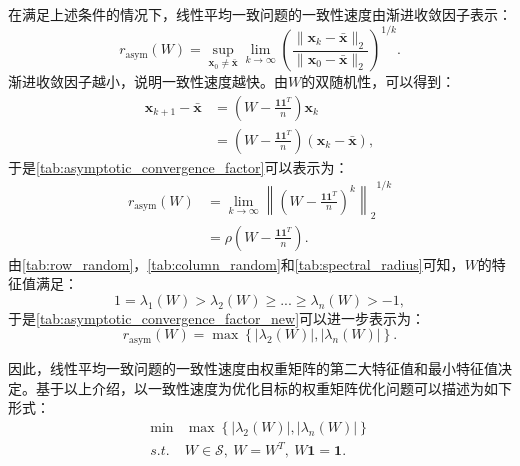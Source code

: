 在满足上述条件的情况下，线性平均一致问题的一致性速度由渐进收敛因子表示：
\begin{equation}
    \label{tab:asymptotic_convergence_factor}
    r_{\mathrm{asym}}(W)=\mathop {\mathrm{sup}} \limits_{\boldsymbol{x}_0\ne \bar{\boldsymbol{x}}}\lim_{k\rightarrow \infty} \left( \frac{\parallel \boldsymbol{x}_k-\bar{\boldsymbol{x}}\parallel _2}{\parallel \boldsymbol{x}_0-\bar{\boldsymbol{x}}\parallel _2} \right) ^{1/k}.
\end{equation}
渐进收敛因子越小，说明一致性速度越快。由$W$的双随机性，可以得到：
\begin{equation}
\begin{aligned}
    \boldsymbol{x}_{k+1}-\bar{\boldsymbol{x}}&=\left( W-\frac{\mathbf{1}\mathbf{1}^T}{n} \right) \boldsymbol{x}_k 
\\
&=\left( W-\frac{\mathbf{1}\mathbf{1}^T}{n} \right) \left( \boldsymbol{x}_k -\bar{\boldsymbol{x}} \right) ,
\end{aligned}
\end{equation}
于是\autoref{tab:asymptotic_convergence_factor}可以表示为：
\begin{equation}
\label{tab:asymptotic_convergence_factor_new}
\begin{aligned}
        r_{\mathrm{asym}}(W)&=\lim_{k\rightarrow \infty} {\left\| \left( W-\frac{\mathbf{1}\mathbf{1}^T}{n} \right) ^k \right\| _2}^{1/k}
        \\
        &=\rho \left( W-\frac{\mathbf{1}\mathbf{1}^T}{n} \right).
\end{aligned}
\end{equation}
由\autoref{tab:row_random}，\autoref{tab:column_random}和\autoref{tab:spectral_radius}可知，$W$的特征值满足：
\begin{equation}
    1=\lambda _1\left( W \right) >\lambda _2\left( W \right) \geqslant ...\geqslant \lambda _n\left( W \right) >-1,
\end{equation}
于是\autoref{tab:asymptotic_convergence_factor_new}可以进一步表示为：
\begin{equation}
\label{tab:asymptotic_convergence_factor_newest}
    r_{\mathrm{asym}}(W)=\max \left\{ \left| \lambda _2\left( W \right) \right|,\left| \lambda _n\left( W \right) \right| \right\}.
\end{equation}

因此，线性平均一致问题的一致性速度由权重矩阵的第二大特征值和最小特征值决定。基于以上介绍，以一致性速度为优化目标的权重矩阵优化问题可以描述为如下形式：
\begin{equation}
    \label{tab:LA_optimization_problem}
    \begin{matrix}
        \min&		\max \left\{ \left| \lambda _2\left( W \right) \right|,\left| \lambda _n\left( W \right) \right| \right\}\\
        s.t.&		W\in \mathcal{S} , \ W=W^T, \ W\mathbf{1}=\mathbf{1}.\\
    \end{matrix}
\end{equation}


